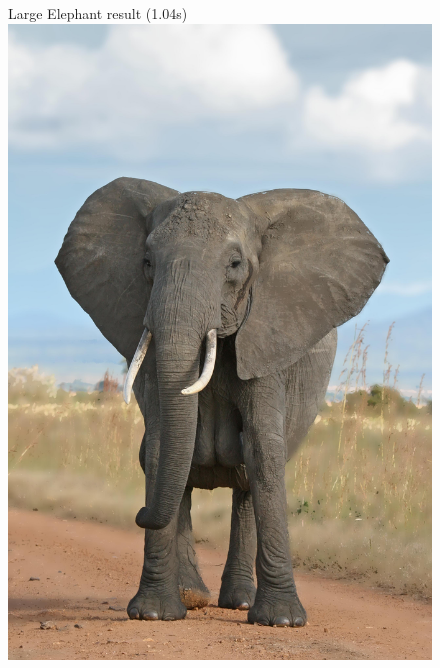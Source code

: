 \documentclass[12pt]{article}
\begin{document}
\begin{figure}[!htb]
    Large Elephant result (1.04s) \\
    \includegraphics[width=0.9\linewidth]{large_elephant_portrait.jpg}
\end{figure}
\end{document}
